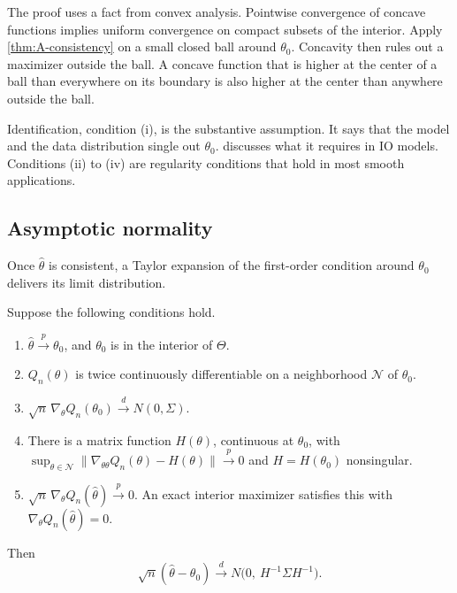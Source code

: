 The proof \citep[Theorem 2.7]{NeweyMcFadden1994} uses a fact from convex analysis. Pointwise convergence of concave
functions implies uniform convergence on compact subsets of the interior. Apply \cref{thm:A-consistency} on a small closed
ball around $\theta_0$. Concavity then rules out a maximizer outside the ball. A concave function that is higher at the
center of a ball than everywhere on its boundary is also higher at the center than anywhere outside the ball.

Identification, condition (i), is the substantive assumption. It says that the model and the data distribution single
out $\theta_0$.  discusses what it requires in IO models. Conditions (ii) to (iv) are
regularity conditions that hold in most smooth applications.

\subsection{Asymptotic normality}\label{sec:A-ext-normality}

Once $\hat\theta$ is consistent, a Taylor expansion of the first-order condition around $\theta_0$ delivers its limit
distribution.

\begin{theorem}\label{thm:A-asy-normal}
Suppose the following conditions hold.
\begin{enumerate}[label=(\roman*)]
  \item $\hat\theta \xrightarrow{p} \theta_0$, and $\theta_0$ is in the interior of $\Theta$.
  \item $Q_n(\theta)$ is twice continuously differentiable on a neighborhood $\mathcal{N}$ of $\theta_0$.
  \item $\sqrt{n}\,\nabla_\theta Q_n(\theta_0) \xrightarrow{d} N(0, \Sigma)$.
  \item There is a matrix function $H(\theta)$, continuous at $\theta_0$, with $\sup_{\theta \in
  \mathcal{N}}\lVert\nabla_{\theta\theta}Q_n(\theta) - H(\theta)\rVert \xrightarrow{p} 0$ and $H = H(\theta_0)$ nonsingular.
  \item $\sqrt{n}\,\nabla_\theta Q_n(\hat\theta) \xrightarrow{p} 0$. An exact interior maximizer satisfies this with
  $\nabla_\theta Q_n(\hat\theta) = 0$.
\end{enumerate}
Then
\begin{equation}\label{eq:A-sandwich}
  \sqrt{n}(\hat\theta - \theta_0) \xrightarrow{d} N\big(0,\ H^{-1}\Sigma H^{-1}\big).
\end{equation}
\end{theorem}

